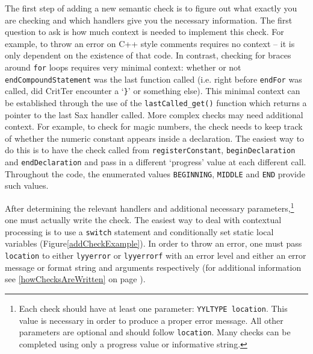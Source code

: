 \documentclass[12pt]{report}
\def\lstlistingname{Figure}
\newcommand{\refCode}{\lstlistingname \hspace{1mm}}
\newcommand{\programName}{CritTer\xspace}
\begin{document}
The first step of adding a new semantic check is to figure out what exactly you are checking and which 
handlers give you the necessary information. The first question to ask is how much context is needed to 
implement this check. For example, to throw an error on C++ style comments requires no context -- it is 
only dependent on the existence of that code. In contrast, checking for braces around \lstinline{for} loops 
requires very minimal context: whether or not \lstinline{endCompoundStatement} was the last function 
called (i.e. right before \lstinline{endFor} was called, did \programName encounter a `\lstinline!}!' or 
something else). This minimal context can be established through the use of the 
\lstinline{lastCalled_get()} function which returns a pointer to the last Sax handler called. More complex 
checks may need additional context. For example, to check for magic numbers, the check needs to keep 
track of whether the numeric constant appears inside a declaration. The easiest way to do this is to have 
the check called from \lstinline{registerConstant}, \lstinline{beginDeclaration} and 
\lstinline{endDeclaration} and pass in a different `progress' value at each different call. Throughout the 
code, the enumerated values \lstinline{BEGINNING}, \lstinline{MIDDLE} and \lstinline{END} provide 
such values.

After determining the relevant handlers and additional necessary parameters,\footnote{Each check 
should have at least one parameter: \lstinline{YYLTYPE location}. This value is necessary in order to 
produce a proper error message. All other parameters are optional and should follow \lstinline{location}. 
Many checks can be completed using only a progress value or informative string.} one must actually 
write the check. The easiest way to deal with contextual processing is to use a \lstinline{switch} 
statement and conditionally set static local variables (\refCode \ref{addCheckExample}). In order to 
throw an error, one must pass \lstinline{location} to either \lstinline{lyyerror} or \lstinline{lyyerrorf} with an 
error level and either an error message or format string and arguments respectively (for additional 
information see \autoref{howChecksAreWritten} on page \pageref{howChecksAreWritten}).
\end{document}
